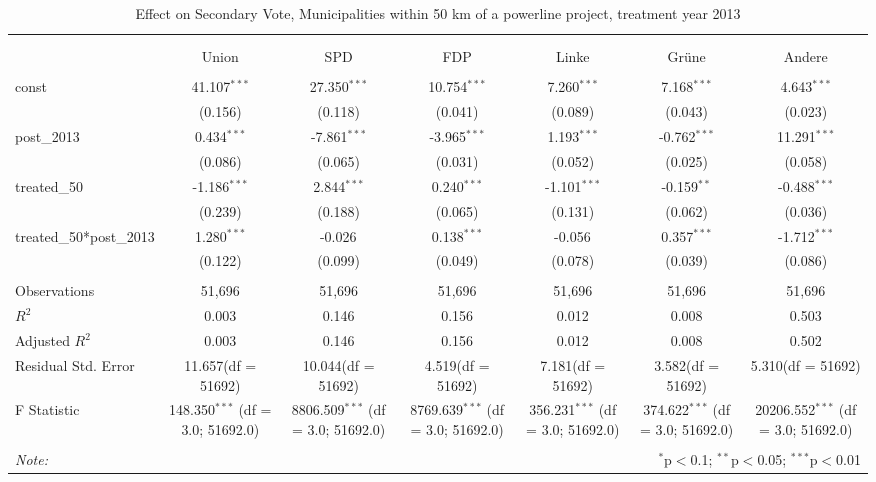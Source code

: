 \documentclass[12pt]{article}
\begin{document}
\begin{table}[!htbp] \centering
  \caption{Effect on Secondary Vote, Municipalities within 50 km of a powerline project, treatment year 2013}
\begin{tabular}{@{\extracolsep{5pt}}lcccccc}
\\[-1.8ex]\hline
\hline \\[-1.8ex]
\\[-1.8ex] & \multicolumn{1}{c}{Union} & \multicolumn{1}{c}{SPD} & \multicolumn{1}{c}{FDP} & \multicolumn{1}{c}{Linke} & \multicolumn{1}{c}{Grüne} & \multicolumn{1}{c}{Andere}  \\
\hline \\[-1.8ex]
 const & 41.107$^{***}$ & 27.350$^{***}$ & 10.754$^{***}$ & 7.260$^{***}$ & 7.168$^{***}$ & 4.643$^{***}$ \\
  & (0.156) & (0.118) & (0.041) & (0.089) & (0.043) & (0.023) \\
 post_2013 & 0.434$^{***}$ & -7.861$^{***}$ & -3.965$^{***}$ & 1.193$^{***}$ & -0.762$^{***}$ & 11.291$^{***}$ \\
  & (0.086) & (0.065) & (0.031) & (0.052) & (0.025) & (0.058) \\
 treated_50 & -1.186$^{***}$ & 2.844$^{***}$ & 0.240$^{***}$ & -1.101$^{***}$ & -0.159$^{**}$ & -0.488$^{***}$ \\
  & (0.239) & (0.188) & (0.065) & (0.131) & (0.062) & (0.036) \\
 treated_50*post_2013 & 1.280$^{***}$ & -0.026$^{}$ & 0.138$^{***}$ & -0.056$^{}$ & 0.357$^{***}$ & -1.712$^{***}$ \\
  & (0.122) & (0.099) & (0.049) & (0.078) & (0.039) & (0.086) \\
\hline \\[-1.8ex]
 Observations & 51,696 & 51,696 & 51,696 & 51,696 & 51,696 & 51,696 \\
 $R^2$ & 0.003 & 0.146 & 0.156 & 0.012 & 0.008 & 0.503 \\
 Adjusted $R^2$ & 0.003 & 0.146 & 0.156 & 0.012 & 0.008 & 0.502 \\
 Residual Std. Error & 11.657(df = 51692) & 10.044(df = 51692) & 4.519(df = 51692) & 7.181(df = 51692) & 3.582(df = 51692) & 5.310(df = 51692)  \\
 F Statistic & 148.350$^{***}$ (df = 3.0; 51692.0) & 8806.509$^{***}$ (df = 3.0; 51692.0) & 8769.639$^{***}$ (df = 3.0; 51692.0) & 356.231$^{***}$ (df = 3.0; 51692.0) & 374.622$^{***}$ (df = 3.0; 51692.0) & 20206.552$^{***}$ (df = 3.0; 51692.0) \\
\hline
\hline \\[-1.8ex]
\textit{Note:} & \multicolumn{6}{r}{$^{*}$p$<$0.1; $^{**}$p$<$0.05; $^{***}$p$<$0.01} \\
\end{tabular}
\end{table}
\end{document}
